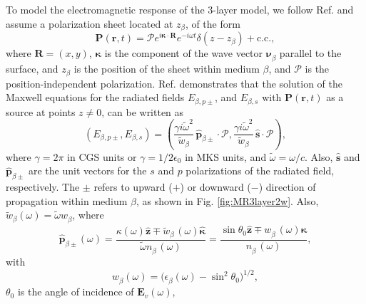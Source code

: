To model the electromagnetic response of the 3-layer model, we follow Ref.
\cite{mizrahiJOSA88} and assume a polarization sheet located at $z_{\beta}$, of
the form
\begin{equation}\label{eq:psheet}
\mathbf{P}(\mathbf{r},t) = \boldsymbol{\mathcal{P}}
e^{i\boldsymbol{\kappa}\cdot\mathbf{R}}e^{-i\omega t}\delta(z - z_{\beta}) 
+ \mathrm{c.c.},
\end{equation}
where $\mathbf{R}=(x,y)$, $\boldsymbol{\kappa}$ is the component of the wave
vector $\boldsymbol{\nu}^{\phantom{a}}_{\beta}$ parallel to the surface, and
$z_{\beta}$ is the position of the sheet within medium $\beta$, and
$\boldsymbol{\mathcal{P}}$ is the position-independent polarization. Ref.
\cite{sipeJOSAB87} demonstrates that the solution of the Maxwell equations for
the radiated fields $E_{\beta,p\pm}$, and $E_{\beta,s}$ with
$\mathbf{P}(\mathbf{r},t)$ as a source at points $z\neq 0$, can be written as
\begin{equation}\label{eq:solmaxwell}
(E_{\beta,p\pm},E_{\beta,s}) = 
(\frac{\gamma i\tilde{\omega}^2}{\tilde{w}_{\beta}}
\,\hat{\mathbf{p}}_{\beta\pm}\cdot\boldsymbol{\mathcal{P}},
\frac{\gamma i\tilde{\omega}^2}{\tilde{w}_{\beta}}
\,\hat{\mathbf{s}}\cdot\boldsymbol{\mathcal{P}}),
\end{equation} 
where $\gamma=2\pi$ in CGS units or $\gamma=1/2\epsilon_{0}$ in MKS units, and
$\tilde{\omega}=\omega/c$. Also, $\hat{\mathbf{s}}$ and
$\hat{\mathbf{p}}_{\beta\pm}$ are the unit vectors for the $s$ and $p$
polarizations of the radiated field, respectively. The $\pm$ refers to upward
($+$) or downward ($-$) direction of propagation within medium $\beta$, as shown
in Fig. \ref{fig:MR3layer2w}. Also,
$\tilde{w}^{\phantom{a}}_{\beta}(\omega)=\tilde{\omega}w^{\phantom{a}}_{\beta}$,
where
\begin{equation}\label{eq:r4}
\hat{\mathbf{p}}^{\phantom{A}}_{\beta\pm}(\omega) =
  \frac{\kappa(\omega)\hat{\mathbf{z}}\mp 
  \tilde{w}^{\phantom{A}}_{\beta}(\omega)\hat{\boldsymbol{\kappa}}} 
  {\tilde{\omega} n^{\phantom{A}}_{\beta}(\omega)}
= \frac{\sin\theta_{0}\hat{\mathbf{z}}\mp 
  w^{\phantom{A}}_{\beta}(\omega)\hat{\boldsymbol{\kappa}}} 
  {n^{\phantom{A}}_{\beta}(\omega)},
\end{equation}
with
\begin{equation}\label{eq:wavevector}
w^{\phantom{a}}_{\beta}(\omega) = 
\big(\epsilon^{\phantom{a}}_{\beta}(\omega) - \sin^{2}\theta_{0}\big)^{1/2},
\end{equation}
$\theta_{0}$ is the angle of incidence of $\mathbf{E}_{v}(\omega)$,

